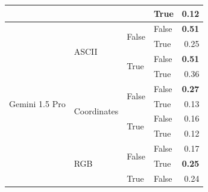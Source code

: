 \begin{tabular}{@{}llllr@{}}
                                                &                                   &                           & True                      & 0.12 \\
    \midrule
    \multirow[c]{13}{*}{Gemini 1.5 Pro}         & \multirow[c]{4}{*}{ASCII}         & \multirow[c]{2}{*}{False} & False                     & \textbf{0.51} \\
                                                &                                   &                           & True                      & 0.25 \\
                                                &                                   & \multirow[c]{2}{*}{True}  & False                     & \textbf{0.51} \\
                                                &                                   &                           & True                      & 0.36 \\
    \cmidrule{2-5}                                                                                                                             
                                                & \multirow[c]{4}{*}{Coordinates}   & \multirow[c]{2}{*}{False} & False                     & \textbf{0.27} \\
                                                &                                   &                           & True                      & 0.13 \\
                                                &                                   & \multirow[c]{2}{*}{True}  & False                     & 0.16 \\
                                                &                                   &                           & True                      & 0.12 \\
    \cmidrule{2-5}                                                                                                                             
                                                & \multirow[c]{4}{*}{RGB}           & \multirow[c]{2}{*}{False} & False                     & 0.17 \\
                                                &                                   &                           & True                      & \textbf{0.25} \\
                                                &                                   & \multirow[c]{2}{*}{True}  & False                     & 0.24 \\

\end{tabular}
